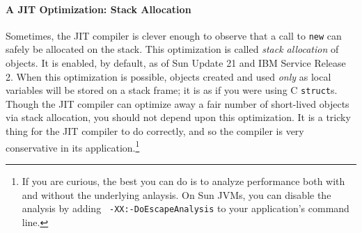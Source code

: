 \paragraph{A JIT Optimization: Stack Allocation}
Sometimes, the JIT compiler is clever enough to observe that a call to {\tt new}
can safely be allocated on the stack. This optimization is called \emph{stack
allocation} of objects. It is enabled, by default, as of
Sun \javasix Update 21 and IBM \javasix Service Release 2. When this
optimization is possible, objects created and used \emph{only} as local variables will be stored
on a stack frame; it is as if you were using C {\tt struct}s.
Though the JIT compiler can optimize away a fair number of short-lived objects
via stack allocation, you should not depend upon this optimization.
It is a tricky thing for the JIT compiler to do correctly, and
so the compiler is very conservative in its application.\footnote{If you are
curious, the best you can do is to analyze performance both with and without the
underlying anlaysis. On Sun JVMs, you can disable the analysis by adding {\tt
-XX:-DoEscapeAnalysis} to your application's command line.}




